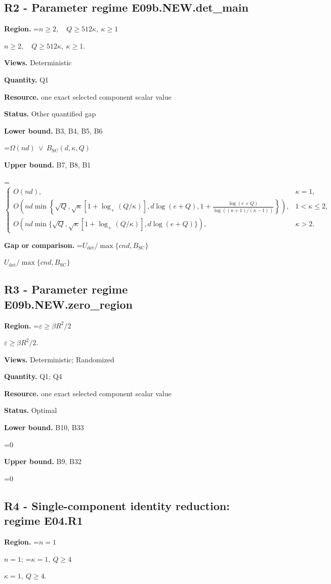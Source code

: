 \documentclass[10pt,a4paper]{article}
\newcommand{\AtlasMath}[1]{\par\begingroup\centering\setbox0=\hbox{$\displaystyle #1$}\ifdim\wd0>1.4\linewidth\typeout{ATLAS WIDE FORMULA: \the\wd0}\fi\ifdim\wd0>\linewidth\resizebox{\linewidth}{!}{\box0}\else\box0\fi\par\endgroup}
\newcommand{\AtlasInlineMath}[1]{\begingroup\setbox0=\hbox{$#1$}\ifdim\wd0>.4\linewidth\endgroup\AtlasMath{#1}\else\endgroup$#1$\fi}
\begin{document}
\subsection{R2 - Parameter regime E09b.NEW.det\_main}
\textbf{Region.} \AtlasInlineMath{n\ge 2,\quad Q\ge512\kappa,\ \kappa\ge1}.

\textbf{Views.} Deterministic

\textbf{Quantity.} Q1

\textbf{Resource.} one exact selected component scalar value

\textbf{Status.} Other quantified gap

\textbf{Lower bound.} B3, B4, B5, B6

\AtlasMath{\Omega(nd)\ \vee\ B_{\mathrm{SC}}(d,\kappa,Q)}
\textbf{Upper bound.} B7, B8, B1

\AtlasMath{\begin{cases}O(nd),&\kappa=1,\\O\left(nd\min\left\{\sqrt Q,\sqrt\kappa[1+\log_+(Q/\kappa)],d\log(e+Q),1+\frac{\log(e+Q)}{\log((\kappa+1)/(\kappa-1))}\right\}\right),&1<\kappa\le2,\\O\left(nd\min\{\sqrt Q,\sqrt\kappa[1+\log_+(Q/\kappa)],d\log(e+Q)\}\right),&\kappa>2.\end{cases}}
\textbf{Gap or comparison.} \AtlasInlineMath{U_{\mathrm{det}}/\max\{cnd,B_{\mathrm{SC}}\}}

\subsection{R3 - Parameter regime E09b.NEW.zero\_region}
\textbf{Region.} \AtlasInlineMath{\varepsilon\ge\beta R^2/2}.

\textbf{Views.} Deterministic; Randomized

\textbf{Quantity.} Q1; Q4

\textbf{Resource.} one exact selected component scalar value

\textbf{Status.} Optimal

\textbf{Lower bound.} B10, B33

\AtlasMath{0}
\textbf{Upper bound.} B9, B32

\AtlasMath{0}
\subsection{R4 - Single-component identity reduction: regime E04.R1}
\textbf{Region.} \AtlasInlineMath{n=1}; \AtlasInlineMath{\kappa=1,\ Q\ge4}.
\end{document}
